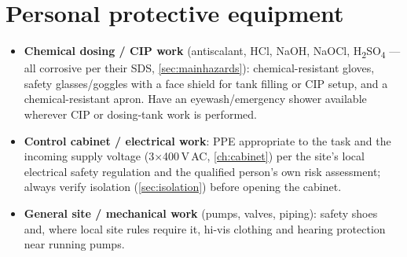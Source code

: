 \documentclass[a4paper,11pt,twoside,openright,numbers=noenddot]{scrreprt}
\begin{document}
\section{Personal protective equipment}
\label{sec:ppe}
\begin{itemize}
\item \textbf{Chemical dosing / CIP work} (antiscalant, HCl, NaOH, NaOCl,
  H\textsubscript{2}SO\textsubscript{4} --- all corrosive per their SDS,
  \cref{sec:mainhazards}): chemical-resistant gloves, safety
  glasses/goggles with a face shield for tank filling or CIP setup, and a
  chemical-resistant apron. Have an eyewash/emergency shower available
  wherever CIP or dosing-tank work is performed.
\item \textbf{Control cabinet / electrical work}: PPE appropriate to the
  task and the incoming supply voltage (3$\times$400\,V\,AC,
  \cref{ch:cabinet}) per the site's local electrical safety regulation and
  the qualified person's own risk assessment; always verify isolation
  (\cref{sec:isolation}) before opening the cabinet.
\item \textbf{General site / mechanical work} (pumps, valves, piping):
  safety shoes and, where local site rules require it, hi-vis clothing and
  hearing protection near running pumps.
\end{itemize}
\end{document}
